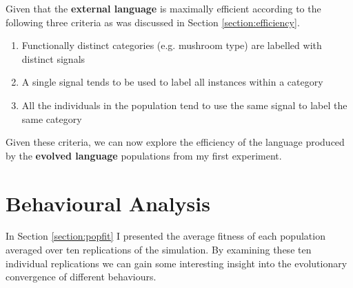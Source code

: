 \documentclass[12pt,a4paper,twoside,openright]{report}
\begin{document}
Given that the {\bf external language} is maximally efficient according to the following three criteria as was discussed in Section \ref{section:efficiency}.

\begin{enumerate}
	\item Functionally distinct categories (e.g. mushroom type) are labelled with distinct signals
	\item A single signal tends to be used to label all instances within a category
	\item All the individuals in the population tend to use the same signal to label the same category
\end{enumerate}

Given these criteria, we can now explore the efficiency of the language produced by the {\bf evolved language} populations from my first experiment. 

\section{Behavioural Analysis}


In Section \ref{section:popfit} I presented the average fitness of each population averaged over ten replications of the simulation. By examining these ten individual replications we can gain some interesting insight into the evolutionary convergence of different behaviours.
\end{document}
